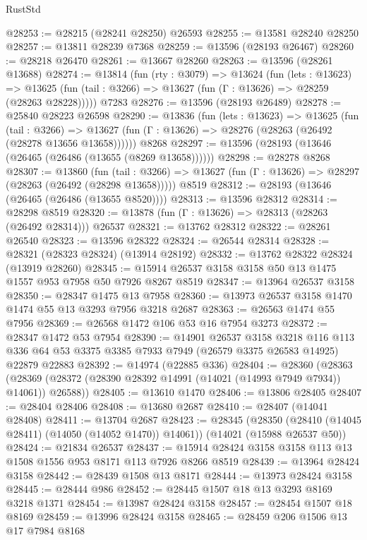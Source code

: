 \begin{lexlean}{RustStd}
\begin{coremodule}
@28253 := @28215 (@28241 @28250) @26593
@28255 := @13581 @28240 @28250
@28257 := @13811 @28239 @7368
@28259 := @13596 (@28193 @26467)
@28260 := @28218 @26470
@28261 := @13667 @28260
@28263 := @13596 (@28261 @13688)
@28274 := @13814
    (fun (rty : @3079) =>
    @13624
      (fun (lets : @13623) =>
      @13625 (fun (tail : @3266) => @13627 (fun (Γ : @13626) => @28259 (@28263 @28228)))))
    @7283
@28276 := @13596 (@28193 @26489)
@28278 := @25840 @28223 @26598
@28290 := @13836
    (fun (lets : @13623) =>
    @13625
      (fun (tail : @3266) =>
      @13627 (fun (Γ : @13626) => @28276 (@28263 (@26492 (@28278 @13656 @13658))))))
    @8268
@28297 := @13596 (@28193 (@13646 (@26465 (@26486 (@13655 (@8269 @13658))))))
@28298 := @28278 @8268
@28307 := @13860
    (fun (tail : @3266) => @13627 (fun (Γ : @13626) => @28297 (@28263 (@26492 (@28298 @13658)))))
    @8519
@28312 := @28193 (@13646 (@26465 (@26486 (@13655 @8520))))
@28313 := @13596 @28312
@28314 := @28298 @8519
@28320 := @13878 (fun (Γ : @13626) => @28313 (@28263 (@26492 @28314))) @26537
@28321 := @13762 @28312
@28322 := @28261 @26540
@28323 := @13596 @28322
@28324 := @26544 @28314
@28328 := @28321 (@28323 @28324) (@13914 @28192)
@28332 := @13762 @28322 @28324 (@13919 @28260)
@28345 := @15914 @26537 @3158 @3158 @50 @13 @1475 @1557 @953 @7958 @50 @7926 @8267 @8519
@28347 := @13964 @26537 @3158
@28350 := @28347 @1475 @13 @7958
@28360 := @13973 @26537 @3158 @1470 @1474 @55 @13 @3293 @7956 @3218 @2687
@28363 := @26563 @1474 @55 @7956
@28369 := @26568 @1472 @106 @53 @16 @7954 @3273
@28372 := @28347 @1472 @53 @7954
@28390 := @14901
    @26537
    @3158
    @3218
    @116
    @113
    @336
    @64
    @53
    @3375
    @3385
    @7933
    @7949
    (@26579 @3375 @26583 @14925)
    @22879
    @22883
@28392 := @14974 (@22885 @336)
@28404 := @28360
    (@28363 (@28369 (@28372 (@28390 @28392 @14991 (@14021 (@14993 @7949 @7934)) @14061)) @26588))
@28405 := @13610 @1470
@28406 := @13806 @28405
@28407 := @28404 @28406
@28408 := @13680 @2687
@28410 := @28407 (@14041 @28408)
@28411 := @13704 @2687
@28423 := @28345
    (@28350 (@28410 (@14045 @28411) (@14050 (@14052 @1470)) @14061))
    (@14021 (@15988 @26537 @50))
@28424 := @21834 @26537
@28437 := @15914 @28424 @3158 @3158 @113 @13 @1508 @1556 @953 @8171 @113 @7926 @8266 @8519
@28439 := @13964 @28424 @3158
@28442 := @28439 @1508 @13 @8171
@28444 := @13973 @28424 @3158
@28445 := @28444 @986
@28452 := @28445 @1507 @18 @13 @3293 @8169 @3218 @1371
@28454 := @13987 @28424 @3158
@28457 := @28454 @1507 @18 @8169
@28459 := @13996 @28424 @3158
@28465 := @28459 @206 @1506 @13 @17 @7984 @8168

\end{coremodule}
\end{lexlean}
